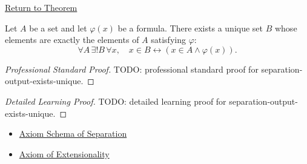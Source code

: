 \newpage
{}
\label{prf:separation-output-exists-unique}

\begin{remark*}[Return]
\hyperref[thm:separation-output-exists-unique]{Return to Theorem}
\end{remark*}

\begin{theorem*}
Let $A$ be a set and let $\varphi(x)$ be a formula. There exists a unique set
$B$ whose elements are exactly the elements of $A$ satisfying $\varphi$:
\[
  \forall A\,\exists! B\,\forall x,\quad
  x\in B\leftrightarrow (x\in A\wedge \varphi(x)).
\]
\end{theorem*}

\begin{proof}[Professional Standard Proof]
\LRAProofBodyStart
TODO: professional standard proof for separation-output-exists-unique.
\end{proof}

\begin{proof}[Detailed Learning Proof]
\LRAProofBodyStart
TODO: detailed learning proof for separation-output-exists-unique.
\end{proof}

\begin{remark*}
\end{remark*}

\begin{dependencies}
\begin{itemize}
  \item \hyperref[ax:separation]{Axiom Schema of Separation}
  \item \hyperref[ax:extensionality]{Axiom of Extensionality}
\end{itemize}
\end{dependencies}

\clearpage
